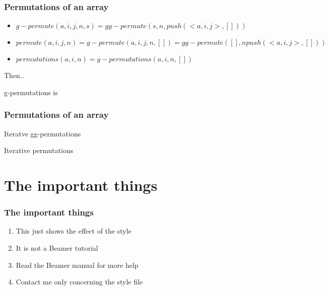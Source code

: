 \documentclass{beamer}
\begin{document}
\begin{frame}
	\frametitle{Permutations of an array}
	\begin{itemize}
		\item $g-permute(a,i,j,n,s) = gg-permute(s,n,push(<a,i,j>,[]))$
		\item $permute(a,i,j,n) = g-permute(a,i,j,n,[]) = gg-permute([],n push(<a,i,j>,[]))$
		\item $permutations(a,i,n) = g-permutations(a,i,n,[])$
	\end{itemize}
	Then..
	\begin{block}{g-permutations is}
		\tiny
		\begin{algorithmic}[1]
					\State {}
				\Else
					\State {}
				\EndIf
			\EndProcedure
		\end{algorithmic}
	\end{block}
\end{frame}
\begin{frame}
	\frametitle{Permutations of an array}
	\begin{block}{Iteratve gg-permutations}
		\tiny
		\begin{algorithmic}[1]
					\State {}
				\Else
					\State {}
				\EndIf
			\EndProcedure
		\end{algorithmic}
	\end{block}
	\begin{block}{Iterative permutations}
		\tiny
		\begin{algorithmic}[1]
				\State {}
			\EndProcedure
		\end{algorithmic}
	\end{block}
\end{frame}
\section{The important things}

\begin{frame}
	\frametitle{The important things}

	\begin{enumerate}
	        \item This just shows the effect of the style
		\item It is not a Beamer tutorial
		\item Read the Beamer manual for more help
		\item Contact me only concerning the style file
	\end{enumerate}
\end{frame}
\end{document}
